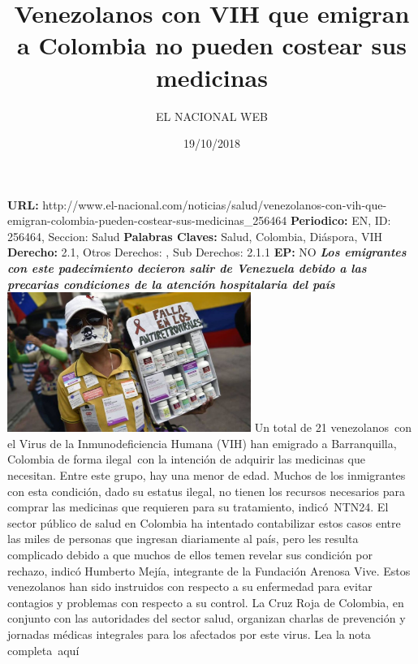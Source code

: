 \documentclass{article}%
\title{\textbf{Venezolanos con VIH que emigran a Colombia no pueden costear sus medicinas}}%
\author{EL NACIONAL WEB}%
\date{19/10/2018}%
\begin{document}
%
\normalsize%
\maketitle%
\textbf{URL: }%
http://www.el{-}nacional.com/noticias/salud/venezolanos{-}con{-}vih{-}que{-}emigran{-}colombia{-}pueden{-}costear{-}sus{-}medicinas\_256464\newline%
%
\textbf{Periodico: }%
EN, %
ID: %
256464, %
Seccion: %
Salud\newline%
%
\textbf{Palabras Claves: }%
Salud, Colombia, Diáspora, VIH\newline%
%
\textbf{Derecho: }%
2.1, %
Otros Derechos: %
, %
Sub Derechos: %
2.1.1\newline%
%
\textbf{EP: }%
NO\newline%
\newline%
%
\textbf{\textit{Los emigrantes con este padecimiento decieron salir de Venezuela debido a las precarias condiciones de la atención hospitalaria del país}}%
\newline%
\newline%
%
\includegraphics[width=300px]{173.jpg}%
\newline%
%
Un total de 21 venezolanos~con el Virus de la Inmunodeficiencia Humana (VIH) han emigrado a Barranquilla, Colombia de forma ilegal~con la intención de adquirir las medicinas que necesitan. Entre este grupo, hay una menor de edad.%
\newline%
%
Muchos de los inmigrantes con esta condición, dado su estatus ilegal, no tienen los recursos necesarios para comprar las medicinas que requieren para su tratamiento, indicó~NTN24.%
\newline%
%
El sector público de salud en Colombia ha intentado contabilizar estos casos entre las miles de personas que ingresan diariamente al país, pero les resulta complicado debido a que muchos de ellos temen revelar sus condición por rechazo, indicó Humberto Mejía, integrante de la Fundación Arenosa Vive.%
\newline%
%
Estos venezolanos han sido instruidos con respecto a su enfermedad para evitar contagios y problemas con respecto a su control.%
\newline%
%
La Cruz Roja de Colombia, en conjunto con las autoridades del sector salud, organizan charlas de prevención y jornadas médicas integrales para los afectados por este virus.%
\newline%
%
Lea la nota completa~aquí%
\newline%
%
\end{document}
